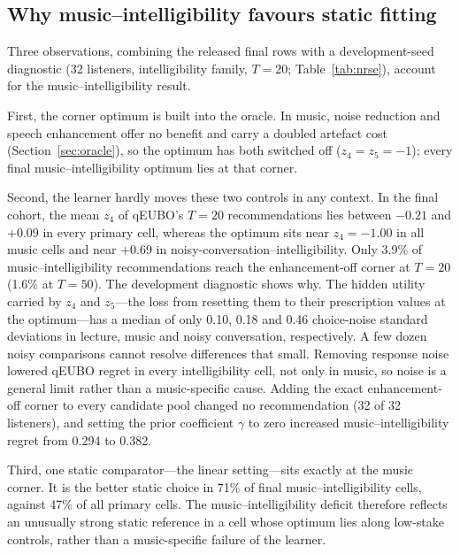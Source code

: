 \documentclass[preprint,12pt]{elsarticle}
\begin{document}
\subsection{Why music--intelligibility favours static fitting}
\label{sec:nrse}

Three observations, combining the released final rows with a development-seed diagnostic (32 listeners, intelligibility family, $T=20$; Table~\ref{tab:nrse}), account for the music--intelligibility result.

First, the corner optimum is built into the oracle. In music, noise reduction and speech enhancement offer no benefit and carry a doubled artefact cost (Section~\ref{sec:oracle}), so the optimum has both switched off ($z_4=z_5=-1$); every final music--intelligibility optimum lies at that corner.

Second, the learner hardly moves these two controls in any context. In the final cohort, the mean $z_4$ of qEUBO's $T=20$ recommendations lies between $-0.21$ and $+0.09$ in every primary cell, whereas the optimum sits near $z_4=-1.00$ in all music cells and near $+0.69$ in noisy-conversation--intelligibility. Only 3.9\% of music--intelligibility recommendations reach the enhancement-off corner at $T=20$ (1.6\% at $T=50$). The development diagnostic shows why. The hidden utility carried by $z_4$ and $z_5$---the loss from resetting them to their prescription values at the optimum---has a median of only 0.10, 0.18 and 0.46 choice-noise standard deviations in lecture, music and noisy conversation, respectively. A few dozen noisy comparisons cannot resolve differences that small. Removing response noise lowered qEUBO regret in every intelligibility cell, not only in music, so noise is a general limit rather than a music-specific cause. Adding the exact enhancement-off corner to every candidate pool changed no recommendation (32 of 32 listeners), and setting the prior coefficient $\gamma$ to zero increased music--intelligibility regret from 0.294 to 0.382.

Third, one static comparator---the linear setting---sits exactly at the music corner. It is the better static choice in 71\% of final music--intelligibility cells, against 47\% of all primary cells. The music--intelligibility deficit therefore reflects an unusually strong static reference in a cell whose optimum lies along low-stake controls, rather than a music-specific failure of the learner.
\end{document}
